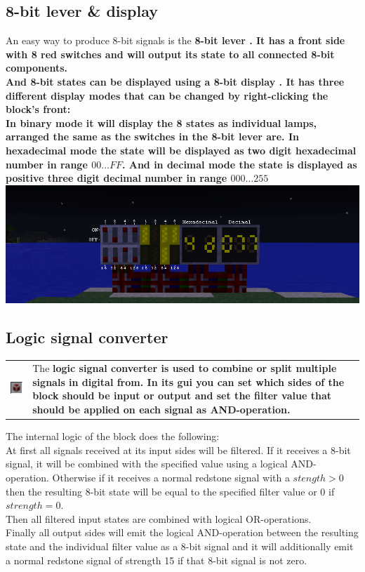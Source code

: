 \documentclass[11pt]{article} %
\makeatletter
\newcommand{\imgtex}{\begin{tabularx}{\textwidth}{@{}c@{ }X@{}}}
\makeatother
\begin{document}
\subsection{8-bit lever \& display}
An easy way to produce 8-bit signals is the \bf 8-bit lever \rm. It has a front side with 8 red switches and will output its state to all connected 8-bit components.\\
And 8-bit states can be displayed using a \bf 8-bit display \rm. It has three different display modes that can be changed by right-clicking the block's front: \\
In binary mode it will display the 8 states as individual lamps, arranged the same as the switches in the 8-bit lever are. In hexadecimal mode the state will be displayed as two digit hexadecimal number in range $00\dots FF$. And in decimal mode the state is displayed as positive three digit decimal number in range $000\dots255$\\
\includegraphics[width=\textwidth]{8_bit_io}\\

\subsection{Logic signal converter}
\imgtex
\includegraphics[align = t]{logic_op} & The \bf logic signal converter \rm is used to combine or split multiple signals in digital from. In its gui you can set which sides of the block should be input or output and set the filter value that should be applied on each signal as AND-operation.\\
\end{tabularx}

The internal logic of the block does the following:\\
At first all signals received at its input sides will be filtered. If it receives a 8-bit signal, it will be combined with the specified value using a logical AND-operation. Otherwise if it receives a normal redstone signal with a $stength > 0$ then the resulting 8-bit state will be equal to the specified filter value or 0 if $strength = 0$.\\
Then all filtered input states are combined with logical OR-operations. \\
Finally all output sides will emit the logical AND-operation between the resulting state and the individual filter value as a 8-bit signal and it will additionally emit a normal redstone signal of strength 15 if that 8-bit signal is not zero.
\end{document}
